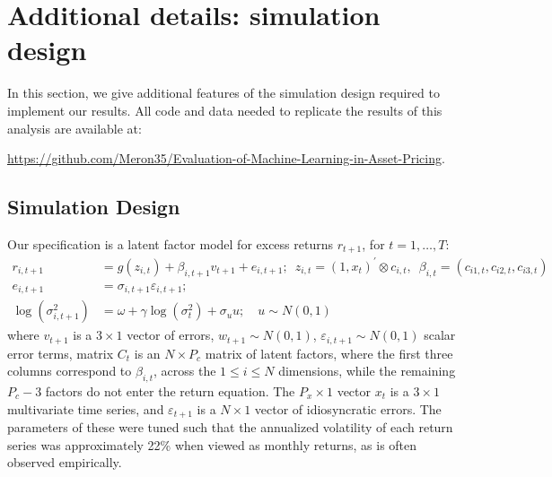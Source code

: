 \documentclass{article}
\begin{document}
\newpage

\section{Additional details: simulation design}
In this section, we give additional features of the simulation design required to implement our results. All code and data needed to replicate the results of this analysis are available at:

\url{https://github.com/Meron35/Evaluation-of-Machine-Learning-in-Asset-Pricing}.

\subsection{Simulation Design}\label{app:simDesign}
Our specification is a latent factor model for excess returns $r_{t+1}$, for $t=1, \dots, T$:
\begin{align*}
r_{i, t+1} &= 
g\left(z_{i, t}\right) + \beta_{i,t+1}v_{t+1} + e_{i, t+1}; 
\enspace z_{i, t} = \left(1, x_{t}\right)^{\prime} \otimes c_{i, t}, 
\enspace \beta_{i, t} = \left(c_{i 1, t}, c_{i 2, t}, c_{i 3, t}\right) \\ 
e_{i, t+1} &= 
\sigma_{i, t+1} \varepsilon_{i, t+1}; \\
\operatorname{log} (\sigma^2_{i,t+1}) &= 
\omega + \gamma \operatorname{log} (\sigma^2_{t}) + \sigma_{u}u;
\quad u \sim N(0, 1)
\end{align*}
where $v_{t+1}$ is a $3\times 1$ vector of errors, $w_{t+1} \sim N(0, 1)$,  $\varepsilon_{i,t+1} \sim N(0, 1)$ scalar error terms, matrix $C_t$ is an $N\times P_c$ matrix of latent factors, where the first three columns correspond to $\beta_{i,t}$, across the $1\leq i\leq N$ dimensions, while the remaining $P_c-3$ factors do not enter the return equation. The $P_x\times1$ vector $x_t$ is a $3 \times 1$ multivariate time series, and $\varepsilon_{t+1}$ is a $N\times 1$ vector of idiosyncratic errors. The parameters of these were tuned such that the annualized volatility of each return series was approximately 22\% when viewed as monthly returns, as is often observed empirically.
\end{document}
